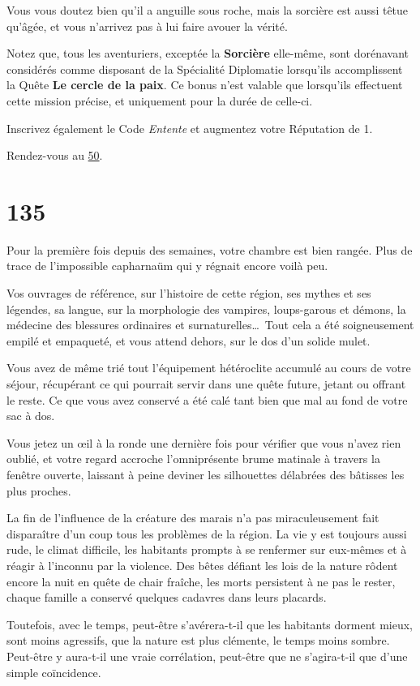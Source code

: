 \documentclass{report}
\newcommand{\gsection}[1]{
    \section{#1}
    \label{section-#1}
}
\newcommand{\glink}[1]{\hyperref[section-#1]{#1}}
\newcommand{\hero}[1]{\textbf{#1}}
\begin{document}
Vous vous doutez bien qu'il a anguille sous roche, mais la sorcière est aussi têtue qu'âgée, et vous n'arrivez pas à lui faire avouer la vérité.

Notez que, tous les aventuriers, exceptée la \hero{Sorcière} elle-même, sont dorénavant considérés comme disposant de la Spécialité Diplomatie lorsqu'ils accomplissent la Quête \textbf{Le cercle de la paix}. Ce bonus n'est valable que lorsqu'ils effectuent cette mission précise, et uniquement pour la durée de celle-ci.

Inscrivez également le Code \emph{Entente} et augmentez votre Réputation de 1.

Rendez-vous au \glink{50}.

\clearpage

\gsection{135}

Pour la première fois depuis des semaines, votre chambre est bien rangée. Plus de trace de l'impossible capharnaüm qui y régnait encore voilà peu. 

Vos ouvrages de référence, sur l'histoire de cette région, ses mythes et ses légendes, sa langue, sur la morphologie des vampires, loups-garous et démons, la médecine des blessures ordinaires et surnaturelles\dots~Tout cela a été soigneusement empilé et empaqueté, et vous attend dehors, sur le dos d'un solide mulet. 

Vous avez de même trié tout l'équipement hétéroclite accumulé au cours de votre séjour, récupérant ce qui pourrait servir dans une quête future, jetant ou offrant le reste. Ce que vous avez conservé a été calé tant bien que mal au fond de votre sac à dos. 

Vous jetez un œil à la ronde une dernière fois pour vérifier que vous n'avez rien oublié, et votre regard accroche l'omniprésente brume matinale à travers la fenêtre ouverte, laissant à peine deviner les silhouettes délabrées des bâtisses les plus proches. 

La fin de l'influence de la créature des marais n'a pas miraculeusement fait disparaître d'un coup tous les problèmes de la région. La vie y est toujours aussi rude, le climat difficile, les habitants prompts à se renfermer sur eux-mêmes et à réagir à l'inconnu par la violence. Des bêtes défiant les lois de la nature rôdent encore la nuit en quête de chair fraîche, les morts persistent à ne pas le rester, chaque famille a conservé quelques cadavres dans leurs placards. 

Toutefois, avec le temps, peut-être s'avérera-t-il que les habitants dorment mieux, sont moins agressifs, que la nature est plus clémente, le temps moins sombre. Peut-être y aura-t-il une vraie corrélation, peut-être que ne s'agira-t-il que d'une simple coïncidence. 
\end{document}
